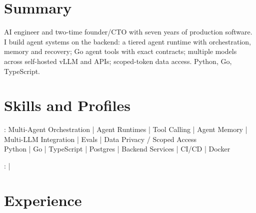 \documentclass[print]{jack-resume}
\begin{document}
\pagecolor{darkmodeBackground}


\begin{minipage}[t][1cm][t]{.03\textwidth}
    \hfill
\end{minipage}

\section{Summary}
AI engineer and two-time founder/CTO with seven years of production software. I build agent systems on the backend: a tiered agent runtime with orchestration, memory and recovery; Go agent tools with exact contracts; multiple models across self-hosted vLLM and APIs; scoped-token data access. Python, Go, TypeScript.
\sectionsep

\section{Skills and Profiles}
:
Multi-Agent Orchestration \hfill | \hfill
Agent Runtimes \hfill | \hfill
Tool Calling \hfill | \hfill
Agent Memory \hfill | \hfill
Multi-LLM Integration \hfill | \hfill
Evals \hfill | \hfill
Data Privacy / Scoped Access \\
\hspace{1.0cm} Python \hfill | \hfill
Go \hfill | \hfill
TypeScript \hfill | \hfill
Postgres \hfill | \hfill
Backend Services \hfill | \hfill
CI/CD \hfill | \hfill
Docker \\

\raggedright{
    :
      \href{https://www.linkedin.com/in/jack-sturtevant/}{ \ExternalLink} |
     \href{https://github.com/jacksturt}{ \ExternalLink}}

\section{Experience}
\end{document}
